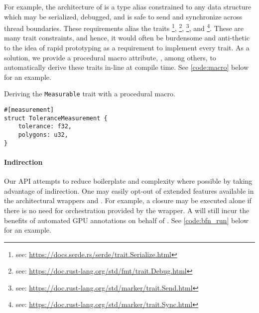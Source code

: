 For example, the architecture of  is a type alias constrained to any data structure which may be serialized, debugged, and is safe to send and synchronize across thread boundaries. These requirements alias the traits \footnote{see: \href{https://docs.serde.rs/serde/trait.Serialize.html}{https://docs.serde.rs/serde/trait.Serialize.html}}, \footnote{see: \href{https://doc.rust-lang.org/std/fmt/trait.Debug.html}{https://doc.rust-lang.org/std/fmt/trait.Debug.html}}, \footnote{see: \href{https://doc.rust-lang.org/std/marker/trait.Send.html}{https://doc.rust-lang.org/std/marker/trait.Send.html}}, and \footnote{see: \href{https://doc.rust-lang.org/std/marker/trait.Sync.html}{https://doc.rust-lang.org/std/marker/trait.Sync.html}}. These are many trait constraints, and hence, it would often be burdensome and anti-thetic to the idea of rapid prototyping as a requirement to implement every trait. As a solution, we provide a procedural macro attribute, \code{#[measurement]}, among others, to automatically derive these traits in-line at compile time. See \cref{code:macro} below for an example.\medskip

\begin{snippet}
\caption{Deriving the \texttt{Measurable} trait with a procedural macro.}\label{code:macro}
\begin{verbatim}
#[measurement]
struct ToleranceMeasurement {
    tolerance: f32,
    polygons: u32,
}
\end{verbatim}
\end{snippet}

\paragraph{Indirection}
Our API attempts to reduce boilerplate and complexity where possible by taking advantage of indirection. One may easily opt-out of extended features available in the architectural wrappers  and . For example, a  closure may be executed alone if there is no need for  orchestration provided by the  wrapper. A  will still incur the benefits of automated GPU annotations on behalf of \toolname. See \cref{code:bfn_run} below for an example.\medskip

